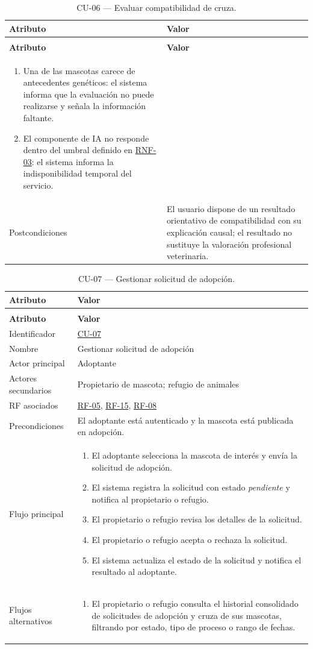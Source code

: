 \documentclass[journal,onecolumn]{IEEEtran}
\makeatletter
\newenvironment{atributos}[2]{%
	\small
	\begin{longtable}{@{}>{\raggedright\arraybackslash}p{4.2cm} >{\raggedright\arraybackslash}p{11.2cm}@{}}
		\caption{#2}\label{tab:#1}\\
		\toprule
		\textbf{Atributo} & \textbf{Valor} \\
		\midrule
		\endfirsthead
		\multicolumn{2}{@{}l}{\small\itshape (continuación)}\\
		\toprule
		\textbf{Atributo} & \textbf{Valor} \\
		\midrule
		\endhead
		\bottomrule
		\endlastfoot
	}{%
	\end{longtable}
	\normalsize
}
\makeatother
\begin{document}
\begin{atributos}{CU-06}{CU-06 --- Evaluar compatibilidad de cruza.}
\begin{enumerate}[leftmargin=*, nosep]
			\item[2.1] Una de las mascotas carece de antecedentes genéticos: el sistema informa que la evaluación no puede realizarse y señala la información faltante.
			\item[5.1] El componente de IA no responde dentro del umbral definido en \hyperref[tab:RNF-03]{RNF-03}: el sistema informa la indisponibilidad temporal del servicio.
		\end{enumerate} \\
		Postcondiciones & El usuario dispone de un resultado orientativo de compatibilidad con su explicación causal; el resultado no sustituye la valoración profesional veterinaria. \\
	\end{atributos}
	
	\begin{atributos}{CU-07}{CU-07 --- Gestionar solicitud de adopción.}
		Identificador & \hyperref[tab:CU-07]{CU-07} \\
		Nombre & Gestionar solicitud de adopción \\
		Actor principal & Adoptante \\
		Actores secundarios & Propietario de mascota; refugio de animales \\
		RF asociados & \hyperref[tab:RF-05]{RF-05}, \hyperref[tab:RF-15]{RF-15}, \hyperref[tab:RF-08]{RF-08} \\
		Precondiciones & El adoptante está autenticado y la mascota está publicada en adopción. \\
		Flujo principal &
		\begin{enumerate}[leftmargin=*, nosep]
			\item El adoptante selecciona la mascota de interés y envía la solicitud de adopción.
			\item El sistema registra la solicitud con estado \emph{pendiente} y notifica al propietario o refugio.
			\item El propietario o refugio revisa los detalles de la solicitud.
			\item El propietario o refugio acepta o rechaza la solicitud.
			\item El sistema actualiza el estado de la solicitud y notifica el resultado al adoptante.
		\end{enumerate} \\
		Flujos alternativos &
		\begin{enumerate}[leftmargin=*, nosep]
			\item[5.1] El propietario o refugio consulta el historial consolidado de solicitudes de adopción y cruza de sus mascotas, filtrando por estado, tipo de proceso o rango de fechas.

\end{enumerate}
\end{atributos}
\end{document}
